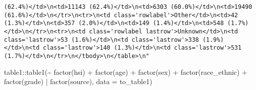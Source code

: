 \documentclass[
]{article}
\newenvironment{Shaded}{\begin{snugshade}}{\end{snugshade}}
\newcommand{\AttributeTok}[1]{\textcolor[rgb]{0.77,0.63,0.00}{#1}}
\newcommand{\FunctionTok}[1]{\textcolor[rgb]{0.00,0.00,0.00}{#1}}
\newcommand{\NormalTok}[1]{#1}
\newcommand{\SpecialCharTok}[1]{\textcolor[rgb]{0.00,0.00,0.00}{#1}}
\begin{document}
\begin{verbatim}
(62.4%)</td>\n<td>11143 (62.4%)</td>\n<td>6303 (60.0%)</td>\n<td>19490 (61.6%)</td>\n</tr>\n<tr>\n<td class='rowlabel'>Other</td>\n<td>42 (1.3%)</td>\n<td>357 (2.0%)</td>\n<td>149 (1.4%)</td>\n<td>548 (1.7%)</td>\n</tr>\n<tr>\n<td class='rowlabel lastrow'>Unknown</td>\n<td class='lastrow'>53 (1.6%)</td>\n<td class='lastrow'>338 (1.9%)</td>\n<td class='lastrow'>140 (1.3%)</td>\n<td class='lastrow'>531 (1.7%)</td>\n</tr>\n</tbody>\n</table>\n"
\end{verbatim}

\begin{Shaded}
\begin{Highlighting}[]
\NormalTok{table1}\SpecialCharTok{::}\FunctionTok{table1}\NormalTok{(}\SpecialCharTok{\textasciitilde{}} \FunctionTok{factor}\NormalTok{(hsi) }\SpecialCharTok{+} \FunctionTok{factor}\NormalTok{(age) }\SpecialCharTok{+} \FunctionTok{factor}\NormalTok{(sex) }\SpecialCharTok{+} 
               \FunctionTok{factor}\NormalTok{(race\_ethnic) }\SpecialCharTok{+} \FunctionTok{factor}\NormalTok{(grade) }\SpecialCharTok{|} \FunctionTok{factor}\NormalTok{(source), }\AttributeTok{data =}\NormalTok{ to\_table1)}
\end{Highlighting}
\end{Shaded}
\end{document}
